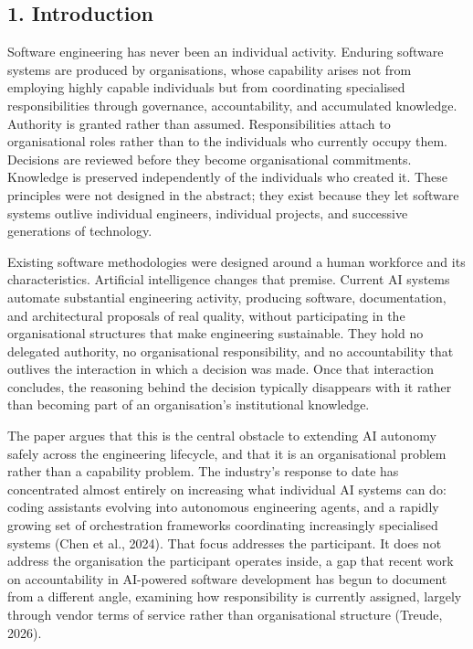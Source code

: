 \documentclass[
  11pt,
]{article}
\begin{document}
\hypertarget{introduction}{%
\subsection{1. Introduction}\label{introduction}}

Software engineering has never been an individual activity. Enduring
software systems are produced by organisations, whose capability arises
not from employing highly capable individuals but from coordinating
specialised responsibilities through governance, accountability, and
accumulated knowledge. Authority is granted rather than assumed.
Responsibilities attach to organisational roles rather than to the
individuals who currently occupy them. Decisions are reviewed before
they become organisational commitments. Knowledge is preserved
independently of the individuals who created it. These principles were
not designed in the abstract; they exist because they let software
systems outlive individual engineers, individual projects, and
successive generations of technology.

Existing software methodologies were designed around a human workforce
and its characteristics. Artificial intelligence changes that premise.
Current AI systems automate substantial engineering activity, producing
software, documentation, and architectural proposals of real quality,
without participating in the organisational structures that make
engineering sustainable. They hold no delegated authority, no
organisational responsibility, and no accountability that outlives the
interaction in which a decision was made. Once that interaction
concludes, the reasoning behind the decision typically disappears with
it rather than becoming part of an organisation's institutional
knowledge.

The paper argues that this is the central obstacle to extending AI
autonomy safely across the engineering lifecycle, and that it is an
organisational problem rather than a capability problem. The industry's
response to date has concentrated almost entirely on increasing what
individual AI systems can do: coding assistants evolving into autonomous
engineering agents, and a rapidly growing set of orchestration
frameworks coordinating increasingly specialised systems (Chen et al.,
2024). That focus addresses the participant. It does not address the
organisation the participant operates inside, a gap that recent work on
accountability in AI-powered software development has begun to document
from a different angle, examining how responsibility is currently
assigned, largely through vendor terms of service rather than
organisational structure (Treude, 2026).
\end{document}
